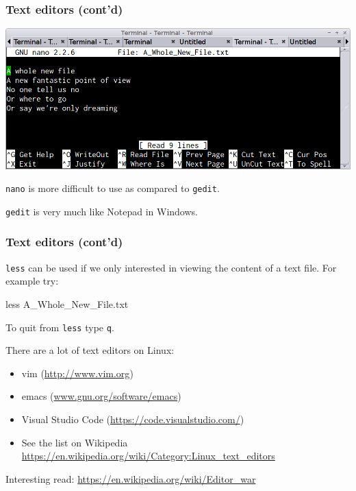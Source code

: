 \documentclass[english,11pt]{beamer}
\begin{document}
\begin{frame}[fragile]
\frametitle{Text editors (cont'd)}

{\centering
\includegraphics[scale=0.25]{images/nano1.png}
\par}

\verb|nano| is more difficult to use as compared to \verb|gedit|.

\verb|gedit| is very much like Notepad in Windows.

\end{frame}


\begin{frame}[fragile]
\frametitle{Text editors (cont'd)}

\verb|less| can be used if we only interested in viewing the content
of a text file. For example try:
\begin{bashcode}
less A_Whole_New_File.txt
\end{bashcode}

To quit from \verb|less| type \verb|q|.

There are a lot of text editors on Linux:
\begin{itemize}
\item vim (\url{http://www.vim.org})
\item emacs (\url{www.gnu.org/software/emacs})
\item Visual Studio Code (\url{https://code.visualstudio.com/})
\item See the list on Wikipedia \url{https://en.wikipedia.org/wiki/Category:Linux_text_editors}
\end{itemize}

Interesting read: \url{https://en.wikipedia.org/wiki/Editor_war}

\end{frame}
\end{document}
